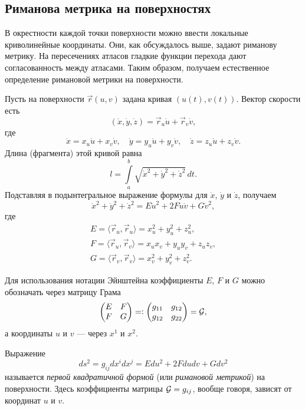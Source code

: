\subsection{Риманова метрика на поверхностях}

В окрестности каждой точки поверхности можно ввести локальные криволинейные координаты. Они, как обсуждалось выше, задают риманову метрику. На пересечениях атласов гладкие функции перехода дают согласованность между атласами. Таким образом, получаем естественное определение римановой метрики на поверхности.

Пусть на поверхности $\vec{r}(u, v)$ задана кривая $(u(t), v(t))$. Вектор скорости есть
\[
	(\dot{x}, \dot{y}, \dot{z}) = \vec{r}_u\dot{u} + \vec{r}_v\dot{v},
\]
где
\[
	\dot{x} = x_u\dot{u} + x_v\dot{v},\quad
	\dot{y} = y_u\dot{u} + y_v\dot{v},\quad
	\dot{z} = z_u\dot{u} + z_v\dot{v}.
\]
Длина (фрагмента) этой кривой равна
\[
	l = \int\limits_a^b\sqrt{\dot{x}^2 + \dot{y}^2 + \dot{z}^2}\,dt.
\]
Подставляя в подынтегральное выражение формулы для $\dot{x}$, $\dot{y}$ и $\dot{z}$, получаем
\[
	\dot{x}^2 + \dot{y}^2 + \dot{z}^2 = E\dot{u}^2 + 2F\dot{u}\dot{v} + G\dot{v}^2,
\]
где
\begin{gather*}
	E = \langle\vec{r}_u, \vec{r}_u\rangle = x_u^2 + y_u^2 + z_u^2,\\
	F = \langle\vec{r}_u, \vec{r}_v\rangle = x_ux_v + y_uy_v + z_uz_v,\\
	G = \langle\vec{r}_v, \vec{r}_v\rangle = x_v^2 + y_v^2 + z_v^2.
\end{gather*}

Для использования нотации Эйнштейна коэффициенты $E$, $F$ и $G$ можно обозначать через матрицу Грама
\[
	\begin{pmatrix}
		E & F\\
		F & G
	\end{pmatrix} = \vcentcolon
	\begin{pmatrix}
		g_{11} & g_{12}\\
		g_{12} & g_{22}
	\end{pmatrix} = \mathcal{G},
\]
а координаты $u$ и $v$ --- через $x^1$ и $x^2$.

\begin{definition}
	Выражение
	\[
		ds^2 = g_{ij}dx^idx^j = Edu^2 + 2Fdudv + Gdv^2
	\]
	называется \textit{первой квадратичной формой} (или \textit{римановой метрикой}) на поверхности. Здесь коэффициенты матрицы $\mathcal{G} = g_{ij}$, вообще говоря, зависят от координат $u$ и $v$.
\end{definition}

